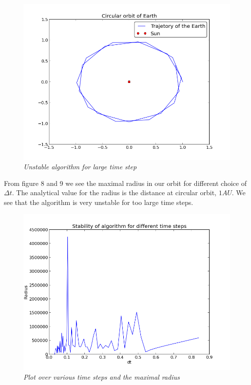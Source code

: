 \documentclass[a4paper,12pt, english]{article}
\begin{document}
\begin{figure}[h!]
  \centering
   	 \includegraphics[scale=0.5]{timesteps_circular.png}
  \caption{\textit{Unstable algorithm for large time step}}
\end{figure}

From figure 8 and 9 we see the maximal radius in our orbit for different choice of $\Delta t$. The analytical value for the radius is the distance at circular orbit, $1 AU$. We see that the algorithm is very unstable for too large time steps.

\begin{figure}[h!]
  \centering
   	 \includegraphics[scale=0.5]{timesteps_stability.png}
  \caption{\textit{Plot over various time steps and the maximal radius}}
\end{figure}
 
\end{document}
